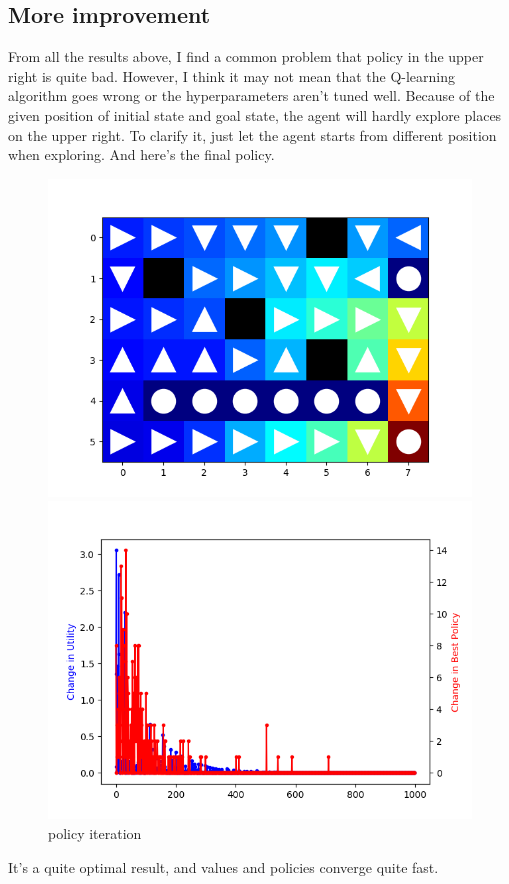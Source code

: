 \documentclass[aps,letterpaper,10pt]{revtex4}
\begin{document}
\subsection{More improvement}
From all the results above, I find a common problem that policy in the upper right 
is quite bad. However, I think it may not mean that the Q-learning algorithm goes wrong or 
the hyperparameters aren't tuned well. Because of the given position of initial state and goal state, the agent will 
hardly explore places on the upper right. To clarify it, just let the agent starts from different position when exploring. 
And here's the final policy.\\
\begin{figure}[htbp] 
    \centering 
    \begin{minipage}[t]{0.5\linewidth}
    \centering 
    \includegraphics[scale=0.5]{_ql_explore.png} 
    \end{minipage}%
    \begin{minipage}[t]{0.5\linewidth} 
    \centering 
    \includegraphics[scale=0.5]{_ql_explore_change.png} 
    \end{minipage}%
    \centering 
    \caption{policy iteration} 
\end{figure}
\par It's a quite optimal result, and values and policies converge quite fast.
\newpage
\end{document}
